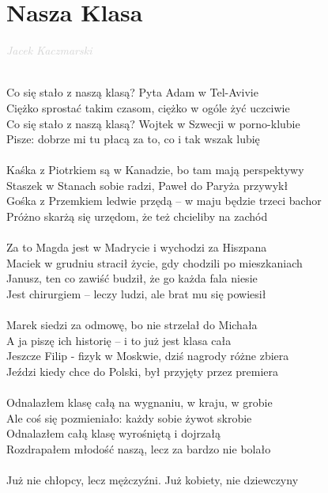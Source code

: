 \documentclass[a5paper, 10pt]{book}
\begin{document}
\newpage
\section{Nasza Klasa}\textcolor{lightgray}{\textit{Jacek Kaczmarski}}\\~\\
\begin{minipage}[t]{0.85\textwidth}
Co się stało z naszą klasą? Pyta Adam w Tel-Avivie\\
Ciężko sprostać takim czasom, ciężko w ogóle żyć uczciwie\\
Co się stało z naszą klasą? Wojtek w Szwecji w porno-klubie\\
Pisze: dobrze mi tu płacą za to, co i tak wszak lubię \\
\\
Kaśka z Piotrkiem są w Kanadzie, bo tam mają perspektywy\\
Staszek w Stanach sobie radzi, Paweł do Paryża przywykł\\
Gośka z Przemkiem ledwie przędą – w maju będzie trzeci bachor\\
Próżno skarżą się urzędom, że też chcieliby na zachód \\
\\
Za to Magda jest w Madrycie i wychodzi za Hiszpana\\
Maciek w grudniu stracił życie, gdy chodzili po mieszkaniach\\
Janusz, ten co zawiść budził, że go każda fala niesie\\
Jest chirurgiem – leczy ludzi, ale brat mu się powiesił \\
\\
Marek siedzi za odmowę, bo nie strzelał do Michała\\
A ja piszę ich historię – i to już jest klasa cała\\
Jeszcze Filip - fizyk w Moskwie, dziś nagrody różne zbiera\\
Jeździ kiedy chce do Polski, był przyjęty przez premiera \\
\\
Odnalazłem klasę całą na wygnaniu, w kraju, w grobie\\
Ale coś się pozmieniało: każdy sobie żywot skrobie\\
Odnalazłem całą klasę wyrośniętą i dojrzałą\\
Rozdrapałem młodość naszą, lecz za bardzo nie bolało \\
\\
Już nie chłopcy, lecz mężczyźni. Już kobiety, nie dziewczyny\\

\end{minipage}
\end{document}
